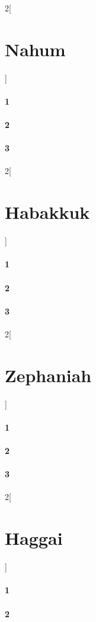\documentclass{book}
\begin{document}
\begin{multicols}{2}[\part{Nahum}]
\subsection*{1}
\subsection*{2}
\subsection*{3}
\end{multicols}
\begin{multicols}{2}[\part{Habakkuk}]
\subsection*{1}
\subsection*{2}
\subsection*{3}
\end{multicols}
\begin{multicols}{2}[\part{Zephaniah}]
\subsection*{1}
\subsection*{2}
\subsection*{3}
\end{multicols}
\begin{multicols}{2}[\part{Haggai}]
\subsection*{1}
\subsection*{2}
\end{multicols}
\end{document}
